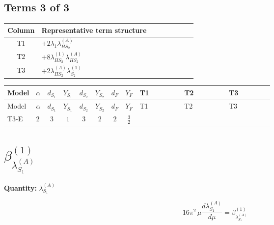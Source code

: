 \documentclass[8pt]{article}
\begin{document}
\begin{landscape}
\subsection*{Terms 3 of 3}
\begin{center}
\begin{tabular}{@{}c >{\raggedright\arraybackslash}p{0.82\linewidth}@{}}
\toprule
Column & Representative term structure \\
\midrule
T1 & \(\displaystyle +2 {\lambda_1} {\lambda_{HS_2}^{(A)}}\) \\
\midrule
T2 & \(\displaystyle +8 {\lambda_{HS_2}^{(1)}} {\lambda_{HS_2}^{(A)}}\) \\
\midrule
T3 & \(\displaystyle +2 {\lambda_{HS_2}^{(A)}} {\lambda_{S_2}^{(1)}}\) \\
\midrule
\bottomrule
\end{tabular}
\end{center}
\smallskip
\tiny
\begin{longtable}{@{}llcccccc >{\raggedright\arraybackslash}p{0.21\linewidth} >{\raggedright\arraybackslash}p{0.21\linewidth} >{\raggedright\arraybackslash}p{0.21\linewidth}@{}}
\toprule
Model & $\alpha$ & $d_{S_1}$ & $Y_{S_1}$ & $d_{S_2}$ & $Y_{S_2}$ & $d_F$ & $Y_F$ & T1 & T2 & T3 \\
\midrule
\endfirsthead
\toprule
Model & $\alpha$ & $d_{S_1}$ & $Y_{S_1}$ & $d_{S_2}$ & $Y_{S_2}$ & $d_F$ & $Y_F$ & T1 & T2 & T3 \\
\midrule
\endhead
T3-E & $2$ & $3$ & $1$ & $3$ & $2$ & $2$ & $\frac{3}{2}$ & \scriptsize\adjustbox{max width=\linewidth}{$\begin{gathered} +2 {\lambda_1} {\lambda_{HS_2}^{(A)}}\end{gathered}$} & \scriptsize\adjustbox{max width=\linewidth}{$\begin{gathered} +8 {\lambda_{HS_2}^{(1)}} {\lambda_{HS_2}^{(A)}}\end{gathered}$} & \scriptsize\adjustbox{max width=\linewidth}{$\begin{gathered} +2 {\lambda_{HS_2}^{(A)}} {\lambda_{S_2}^{(1)}}\end{gathered}$} \\
\midrule
\bottomrule
\end{longtable}
\clearpage
\section*{$\beta_{\lambda_{S_1}^{(A)}}^{(1)}$}
\noindent\textbf{Quantity: }$\lambda_{S_1}^{(A)}$\par\smallskip
\[16\pi^2\,\mu\frac{d \lambda_{S_1}^{(A)}}{d\mu}=\beta_{\lambda_{S_1}^{(A)}}^{(1)}\]

\end{landscape}
\end{document}
